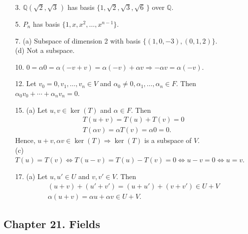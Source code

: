 {\small
\begin{itemize}
 
\item[3.] 
${\mathbb Q}(\sqrt{2}, \sqrt{3}\, )$ has basis $\{ 1, \sqrt{2}, \sqrt{3},
\sqrt{6}\, \}$  over ${\mathbb Q}$.
 
\item[5.]
$P_n$ has basis $\{ 1, x, x^2, \ldots, x^{n-1} \}$.
 
\item[7.]
(a) Subspace of dimension 2 with basis $\{(1, 0, -3), (0, 1,
2) \}$.\\
(d) Not a subspace.
 
\item[10.]
$0 =  \alpha 0 = \alpha(-v+v) = \alpha(-v) + \alpha v \Rightarrow 
-\alpha v = \alpha(-v)$.
 
\item[12.]
Let $v_0 = 0, v_1, \ldots, v_n \in V$ and $\alpha_0 \neq 0, \alpha_1,
\ldots, \alpha_n \in F$. Then $\alpha_0 v_0 + \cdots + \alpha_n v_n =
0$.
 
\item[15.]
(a)
Let $u, v \in \ker(T)$ and $\alpha \in F$.  Then
\[
\begin{array}{c}
T(u +v) = T(u) + T(v) = 0 \\
T(\alpha v) = \alpha T(v) = \alpha 0 = 0.
\end{array}
\]
Hence, $u + v, \alpha v \in \ker(T) \Rightarrow \ker(T)$ is 
a subspace of
$V$. \\
(c) 
$T(u) = T(v) \Leftrightarrow T(u-v) = T(u) - T(v) = 0
\Leftrightarrow u-v = 0 \Leftrightarrow u = v$.
 
 
\item[17.]
(a)
Let $u, u' \in U$ and $v, v' \in V$. Then
\[
\begin{array}{c}
(u + v) + (u' + v') = (u + u') + (v + v') \in U + V \\
\alpha(u + v) = \alpha u + \alpha v \in U + V.
\end{array}
\]
 
\end{itemize}
}
 
\subsection*{Chapter 21. Fields}
 
